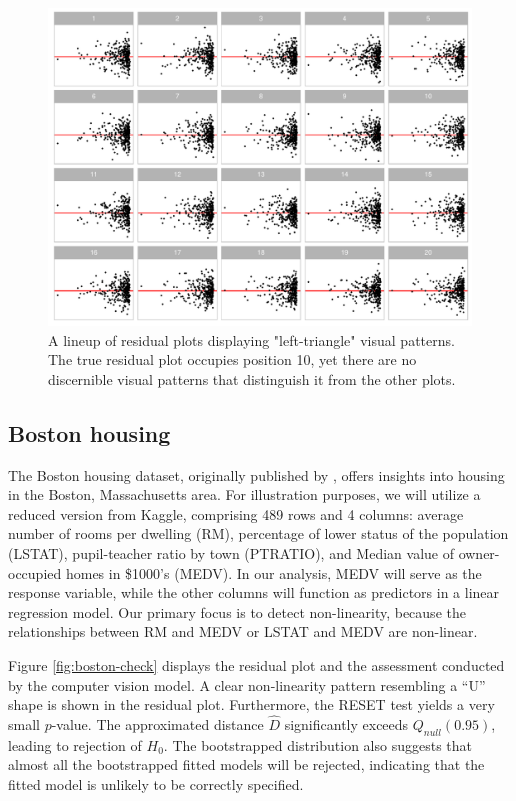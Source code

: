 \documentclass[]{interact}
\theoremstyle{plain}%
\theoremstyle{definition}
\theoremstyle{remark}
\begin{document}
\begin{figure}[!h]

{\centering \includegraphics[width=1\linewidth]{paper_files/figure-latex/false-lineup-1} 

}

\caption{A lineup of residual plots displaying "left-triangle" visual patterns. The true residual plot occupies position 10, yet there are no discernible visual patterns that distinguish it from the other plots.}\label{fig:false-lineup}
\end{figure}

\subsection{Boston housing}\label{boston-housing}

The Boston housing dataset, originally published by
\citet{harrison1978hedonic}, offers insights into housing in the Boston,
Massachusetts area. For illustration purposes, we will utilize a reduced
version from Kaggle, comprising 489 rows and 4 columns: average number
of rooms per dwelling (RM), percentage of lower status of the population
(LSTAT), pupil-teacher ratio by town (PTRATIO), and Median value of
owner-occupied homes in \$1000's (MEDV). In our analysis, MEDV will
serve as the response variable, while the other columns will function as
predictors in a linear regression model. Our primary focus is to detect
non-linearity, because the relationships between RM and MEDV or LSTAT
and MEDV are non-linear.

Figure \ref{fig:boston-check} displays the residual plot and the
assessment conducted by the computer vision model. A clear non-linearity
pattern resembling a ``U'' shape is shown in the residual plot.
Furthermore, the RESET test yields a very small \(p\)-value. The
approximated distance \(\hat{D}\) significantly exceeds
\(Q_{null}(0.95)\), leading to rejection of \(H_0\). The bootstrapped
distribution also suggests that almost all the bootstrapped fitted
models will be rejected, indicating that the fitted model is unlikely to
be correctly specified.
\end{document}
